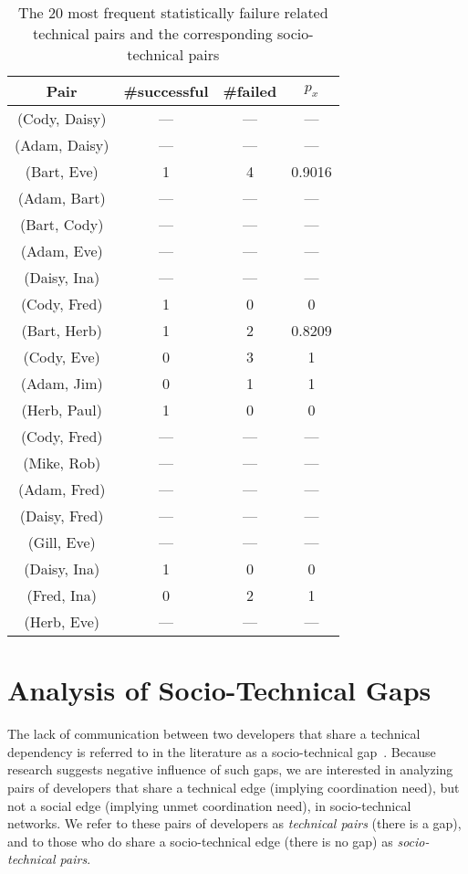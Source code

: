 \begin{table}[t]
\centering
\caption{The 20 most frequent statistically failure related technical pairs and the corresponding socio-technical pairs}
\begin{tabular}{@{\hspace{.2cm}}ccc@{\hspace{.75cm}}c@{\hspace{.2cm}}}
\toprule
Pair & \#successful & \#failed & $p_x$ \\
\midrule
(Cody, Daisy)	&	---&	---&	---\\
(Adam, Daisy)	&	---&	---&	---\\
(Bart, Eve)	&	1&	4&	0.9016\\
(Adam, Bart)	&	---&	---&	---\\
(Bart, Cody)	&	---&	---&	---\\
(Adam, Eve)	&	---&	---&	---\\
(Daisy, Ina)	&	---&	---&	---\\
(Cody, Fred)	&	1&	0&	0\\
(Bart, Herb)	&	1&	2&	0.8209\\
(Cody, Eve)	&	0&	3&	1\\
(Adam, Jim)	&	0&	1&	1\\
(Herb, Paul)	&	1&	0&	0\\
(Cody, Fred)	&	---&	---&	---\\
(Mike, Rob)	&	---&	---&	---\\
(Adam, Fred)	&	---&	---&	---\\
(Daisy, Fred)	&	---&	---&	---\\
(Gill, Eve)		&	---&	---&	---\\
(Daisy, Ina)	&	1&	0&	0\\
(Fred, Ina)	&	0&	2&	1\\
(Herb, Eve)	&	---&	---&	---\\
\bottomrule
\end{tabular}
\label{tab:stechpairs}
\end{table}


\section{Analysis of Socio-Technical Gaps}
\label{ch8:gaps}
The lack of communication between two developers that share a
technical dependency is referred to in the literature as a
socio-technical gap~\cite{valetto:msr:2007}. Because research suggests negative influence of such gaps, we are interested in analyzing pairs of developers that share a technical edge (implying coordination need), but not a social edge (implying
unmet coordination need), in socio-technical networks. We refer to these pairs of
developers as \emph{technical pairs} (there is a gap), and to those who do
share a socio-technical edge (there is no gap) as \emph{socio-technical pairs}. 

